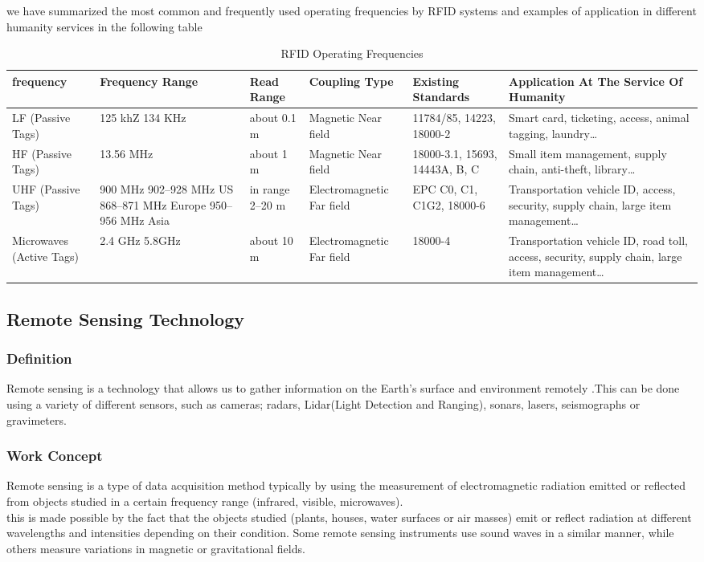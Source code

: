 we have summarized the most common and frequently used operating frequencies by RFID systems and examples of application in different humanity services in the following table \\
\begin{table}[h]
	
	\centering
	\begin{tabular}{|p{2cm}|p{2cm}|p{1cm}|p{3cm}|p{2.5cm}|p{4cm}|}
		\hline
		frequency &Frequency Range&Read Range&Coupling Type&Existing Standards&Application At The Service Of Humanity\\ \hline
		LF (Passive Tags)&125 khZ 134 KHz &about 0.1 m&Magnetic
		Near field&11784/85, 14223, 18000-2&Smart card, ticketing, access, animal tagging, laundry…\\ \hline
		HF (Passive Tags)&13.56 MHz&about 1 m&Magnetic Near field&18000-3.1, 15693, 14443A, B, C&Small item management, supply chain, anti-theft, library…\\ \hline
		UHF (Passive Tags)&900 MHz 902–928 MHz US
		868–871 MHz Europe
		950–956 MHz Asia&in range 2–20 m&Electromagnetic 
		Far field &EPC C0, C1, C1G2, 18000-6&Transportation vehicle ID, access, security, supply chain, large item management…\\ \hline
		Microwaves (Active Tags)&2.4 GHz  5.8GHz&about 10 m&Electromagnetic Far field&18000-4&Transportation vehicle ID, road toll, access, security, supply chain, large item management…\\ \hline
		
	\end{tabular}
	\caption{RFID Operating Frequencies} 
\end{table}




\subsection{Remote Sensing Technology}
\subsubsection{Definition}
Remote sensing is a technology that allows us to gather information on the Earth's surface and  environment remotely .This can be done using a variety of different sensors, such as cameras; radars, Lidar(Light Detection and Ranging), sonars, lasers,  seismographs or gravimeters. \cite{girard2018processing}\\
\subsubsection{Work Concept}
Remote sensing is a type of data acquisition method typically by using the measurement of electromagnetic radiation emitted or reflected from objects studied in a certain frequency range (infrared, visible, microwaves).\\this is made possible by the fact that the objects studied (plants, houses, water surfaces or air masses) emit or reflect radiation at different wavelengths and intensities depending on their condition. Some remote sensing instruments use sound waves in a similar manner, while others measure variations in magnetic or gravitational fields.\cite{denis2020travaux}

